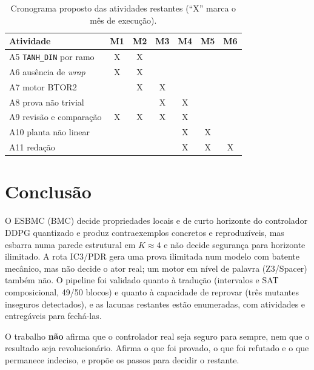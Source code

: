 \documentclass[12pt,openright,oneside,a4paper,chapter=TITLE,sumario=tradicional,english,brazil]{abntex2}
\begin{document}
\begin{table}[htb]
\caption{Cronograma proposto das atividades restantes (``X'' marca o mês de execução).}\label{tab:crono}
\centering
\begin{tabular}{l|c|c|c|c|c|c}
\toprule
\textbf{Atividade} & \textbf{M1} & \textbf{M2} & \textbf{M3} & \textbf{M4} & \textbf{M5} & \textbf{M6} \\
\midrule
A5 \texttt{TANH\_DIN} por ramo  & X & X &   &   &   &   \\
A6 ausência de \emph{wrap}      & X & X &   &   &   &   \\
A7 motor BTOR2                  &   & X & X &   &   &   \\
A8 prova não trivial            &   &   & X & X &   &   \\
A9 revisão e comparação         & X & X & X & X &   &   \\
A10 planta não linear           &   &   &   & X & X &   \\
A11 redação                     &   &   &   & X & X & X \\
\bottomrule
\end{tabular}
\end{table}

\chapter{Conclusão}\label{cap:concl}

O ESBMC (BMC) decide propriedades locais e de curto horizonte do controlador DDPG quantizado e produz contraexemplos concretos e reproduzíveis, mas esbarra numa parede estrutural em $K\approx4$ e não decide segurança para horizonte ilimitado. A rota IC3/PDR gera uma prova ilimitada num modelo com batente mecânico, mas não decide o ator real; um motor em nível de palavra (Z3/Spacer) também não. O pipeline foi validado quanto à tradução (intervalos e SAT composicional, 49/50 blocos) e quanto à capacidade de reprovar (três mutantes inseguros detectados), e as lacunas restantes estão enumeradas, com atividades e entregáveis para fechá-las.

O trabalho \textbf{não} afirma que o controlador real seja seguro para sempre, nem que o resultado seja revolucionário. Afirma o que foi provado, o que foi refutado e o que permanece indeciso, e propõe os passos para decidir o restante.
\end{document}
